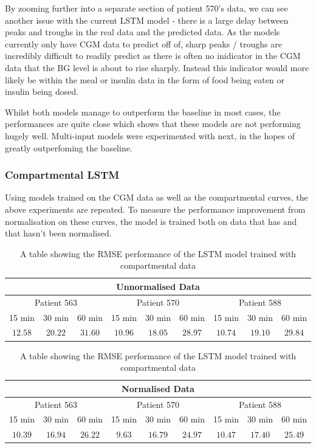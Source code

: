       By zooming further into a separate section of patient 570's data, we can see another issue with the current LSTM model - there is a large delay between peaks and troughs in the real data and the predicted data. As the models currently only have CGM data to predict off of, sharp peaks / troughs are incredibly difficult to readily predict as there is often no inidicator in the CGM data that the BG level is about to rise sharply. Instead this indicator would more likely be within the meal or insulin data in the form of food being eaten or insulin being dosed.

      Whilst both models manage to outperform the baseline in most cases, the performances are quite close which shows that these models are not performing hugely well. Multi-input models were experimented with next, in the hopes of greatly outperfoming the baseline.

    \subsubsection{Compartmental LSTM}

    Using models trained on the CGM data as well as the compartmental curves, the above experiments are repeated. To measure the performance improvement from normalisation on these curves, the model is trained both on data that has and that hasn't been normalised.

    \begin{table}[H]
      \centering
      \caption{A table showing the RMSE performance of the LSTM model trained with compartmental data}
      \begin{tabular}{|*{9}{c|}} 
        \hline
        \multicolumn{9}{|c|}{Unnormalised Data} \\ \hline
        \multicolumn{3}{|c}{Patient 563} & \multicolumn{3}{|c}{Patient 570} & \multicolumn{3}{|c|}{Patient 588} \\ \hline 
        15 min & 30 min & 60 min &15 min & 30 min & 60 min &15 min & 30 min & 60 min \\ \hline
        $12.58$&$20.22$ &$31.60$ &$10.96$ &$18.05$ & $28.97$&$10.74$ &$19.10$ &$29.84$ \\ \hline
      \end{tabular}
      \begin{tabular}{|*{9}{c|}} 
        \hline
        \multicolumn{9}{|c|}{Normalised Data} \\ \hline
        \multicolumn{3}{|c}{Patient 563} & \multicolumn{3}{|c}{Patient 570} & \multicolumn{3}{|c|}{Patient 588} \\ \hline 
        15 min & 30 min & 60 min &15 min & 30 min & 60 min &15 min & 30 min & 60 min \\ \hline
        $10.39$ &$16.94$ &$26.22$ &$9.63$ &$16.79$ &$24.97$ &$10.47$ &$17.40$ &$25.49$ \\ \hline
      \end{tabular}
    \end{table}


